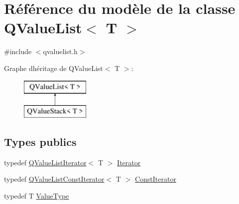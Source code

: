 \hypertarget{class_q_value_list}{}\section{Référence du modèle de la classe Q\+Value\+List$<$ T $>$}
\label{class_q_value_list}


{\ttfamily \#include $<$qvaluelist.\+h$>$}

Graphe d\textquotesingle{}héritage de Q\+Value\+List$<$ T $>$\+:\begin{figure}[H]
\begin{center}
\leavevmode
\includegraphics[height=2.000000cm]{class_q_value_list}
\end{center}
\end{figure}
\subsection*{Types publics}
\begin{DoxyCompactItemize}
\item 
typedef \hyperlink{class_q_value_list_iterator}{Q\+Value\+List\+Iterator}$<$ T $>$ \hyperlink{class_q_value_list_a043c8661906b45f062d493601804a5ea}{Iterator}
\item 
typedef \hyperlink{class_q_value_list_const_iterator}{Q\+Value\+List\+Const\+Iterator}$<$ T $>$ \hyperlink{class_q_value_list_a945cde34d45626792d1c5c8012b9b680}{Const\+Iterator}
\item 
typedef T \hyperlink{class_q_value_list_a7113a9ee26d6a196a3e4f35b23a48331}{Value\+Type}
\end{DoxyCompactItemize}
